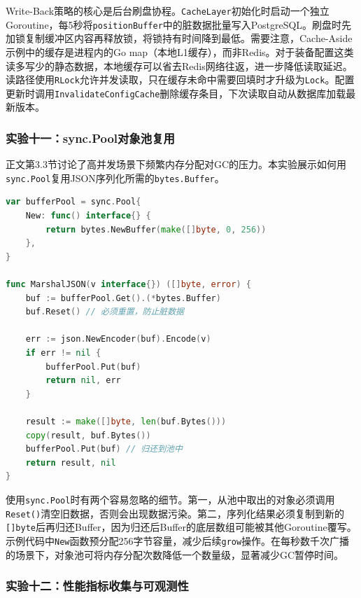 Write-Back策略的核心是后台刷盘协程。\texttt{CacheLayer}初始化时启动一个独立Goroutine，每5秒将\texttt{positionBuffer}中的脏数据批量写入PostgreSQL。刷盘时先加锁复制缓冲区内容再释放锁，将锁持有时间降到最低。需要注意，Cache-Aside示例中的缓存是进程内的Go map（本地L1缓存），而非Redis。对于装备配置这类读多写少的静态数据，本地缓存可以省去Redis网络往返，进一步降低读取延迟。读路径使用\texttt{RLock}允许并发读取，只在缓存未命中需要回填时才升级为\texttt{Lock}。配置更新时调用\texttt{InvalidateConfigCache}删除缓存条目，下次读取自动从数据库加载最新版本。

\subsubsection{实验十一：sync.Pool对象池复用}

正文第3.3节讨论了高并发场景下频繁内存分配对GC的压力。本实验展示如何用\texttt{sync.Pool}复用JSON序列化所需的\texttt{bytes.Buffer}。

\begin{tcolorbox}[title=sync.Pool复用序列化缓冲区]
\begin{lstlisting}[style=codeblock, language=go]
var bufferPool = sync.Pool{
    New: func() interface{} {
        return bytes.NewBuffer(make([]byte, 0, 256))
    },
}

func MarshalJSON(v interface{}) ([]byte, error) {
    buf := bufferPool.Get().(*bytes.Buffer)
    buf.Reset() // 必须重置，防止脏数据

    err := json.NewEncoder(buf).Encode(v)
    if err != nil {
        bufferPool.Put(buf)
        return nil, err
    }

    result := make([]byte, len(buf.Bytes()))
    copy(result, buf.Bytes())
    bufferPool.Put(buf) // 归还到池中
    return result, nil
}
\end{lstlisting}
\end{tcolorbox}

使用\texttt{sync.Pool}时有两个容易忽略的细节。第一，从池中取出的对象必须调用\texttt{Reset()}清空旧数据，否则会出现数据污染。第二，序列化结果必须复制到新的\texttt{[]byte}后再归还Buffer，因为归还后Buffer的底层数组可能被其他Goroutine覆写。示例代码中\texttt{New}函数预分配256字节容量，减少后续\texttt{grow}操作。在每秒数千次广播的场景下，对象池可将内存分配次数降低一个数量级，显著减少GC暂停时间。

\subsubsection{实验十二：性能指标收集与可观测性}


